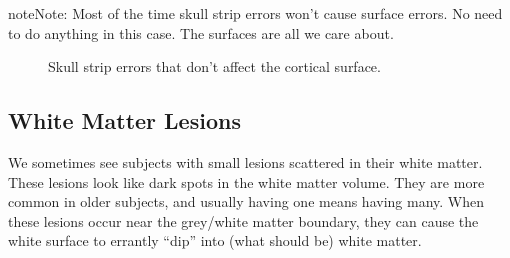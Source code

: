 \documentclass[letterpaper,10pt,openany,oneside]{sphinxmanual}
\begin{document}
\begin{notice}{note}{Note:}
Most of the time skull strip errors won't cause surface errors. No
need to do anything in this case. The surfaces are all we care about.
\end{notice}
\begin{figure}[htbp]
\centering
\capstart

\caption{Skull strip errors that don't affect the cortical surface.}\end{figure}


\subsection{White Matter Lesions}
\label{surface_reconstruction:white-matter-lesions}
We sometimes see subjects with small lesions scattered in their white matter.
These lesions look like dark spots in the white matter volume. They are more
common in older subjects, and usually having one means having many. When these
lesions occur near the grey/white matter boundary, they can cause the white
surface to errantly ``dip'' into (what should be) white matter.
\end{document}
